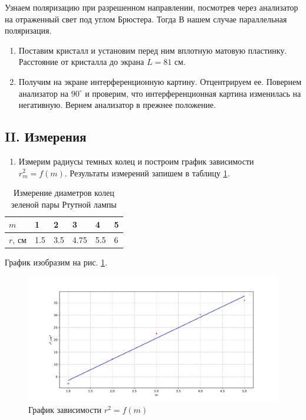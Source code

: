 \documentclass[a4paper,12pt]{article}
\begin{document}
Узнаем поляризацию при разрешенном направлении, посмотрев через анализатор на отраженный свет под углом Брюстера. Тогда В нашем случае параллельная поляризация.

\begin{enumerate}[resume]
    \item Поставим кристалл и установим перед ним вплотную матовую пластинку. Расстояние от кристалла до экрана $L = 81$ см. 
    \item Получим на экране интерференционную картину. Отцентрируем ее. Повернем анализатор на $90^\circ$ и проверим, что интерференционная картина изменилась на негативную. Вернем анализатор в прежнее положение.
\end{enumerate}

\subsection*{II. Измерения}

\begin{enumerate}[resume]
    \item Измерим радиусы темных колец и построим график зависимости $r^2_m = f(m)$. Результаты измерений запишем в таблицу \ref{table:1}.
\end{enumerate}

\begin{table}[!ht]
    \centering
    \caption{Измерение диаметров колец зеленой пары Ртутной лампы}
    \begin{tabular}{|l|l|l|l|l|l|}
        \hline
        $m$     & 1   & 2   & 3    & 4   & 5 \\ \hline
        $r$, см & 1.5 & 3.5 & 4.75 & 5.5 & 6 \\ \hline
    \end{tabular}
    \label{table:1}
\end{table}

График изобразим на рис. \ref{graph:1}.


\FloatBarrier
\begin{figure}[!h]
    \centering
    \includegraphics[scale=0.65]{graph-1.pdf}
    \caption{График зависимости $r^2 = f(m)$}
    \label{graph:1}
\end{figure}
\FloatBarrier
\end{document}
